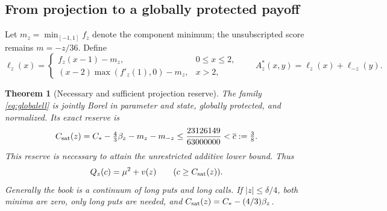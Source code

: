 \documentclass[11pt,a4paper]{amsart}
\theoremstyle{plain}
\newtheorem{theorem}{Theorem}[section]
\theoremstyle{definition}
\theoremstyle{remark}
\begin{document}
\subsection{From projection to a globally protected payoff}
Let $m_z=\min_{[-1,1]}f_z$ denote the component minimum; the unsubscripted score remains $m=-z/36$. Define
\begin{equation}\label{eq:globalell}
 \ell_z(x)=
 \begin{cases}
 f_z(x-1)-m_z,&0\le x\le2,\\
 (x-2)\max(f'_z(1),0)-m_z,&x>2,
 \end{cases}
 \qquad A_z^*(x,y)=\ell_z(x)+\ell_{-z}(y).
\end{equation}

\begin{theorem}[Necessary and sufficient projection reserve]\label{thm:reserve}
The family \eqref{eq:globalell} is jointly Borel in parameter and state, globally protected, and normalized. Its exact reserve is
\begin{equation}\label{eq:saturationreserve}
 C_{\rm sat}(z)=C_*-\tfrac43\beta_z-m_z-m_{-z}
 \le\frac{23126149}{63000000}<\overline c:=\tfrac38.
\end{equation}
This reserve is necessary to attain the unrestricted additive lower bound. Thus
\begin{equation}\label{eq:signedvalue}
 Q_z(c)=\mu^2+v(z)\qquad(c\ge C_{\rm sat}(z)).
\end{equation}
Generally the book is a continuum of long puts and long calls. If $|z|\le\delta/4$, both minima are zero, only long puts are needed, and $C_{\rm sat}(z)=C_*-(4/3)\beta_z$.
\end{theorem}
\end{document}
